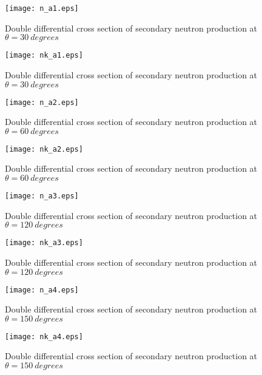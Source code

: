 \documentclass[12pt]{article}
\begin{document}
\begin{figure}[htbp]
\caption{Double differential cross section of secondary neutron production at $\theta = 30~degrees$}
\label{figa1} 
\centerline{\texttt{[image: n\_a1.eps]}}
\end{figure}

\begin{figure}[htbp]
\caption{Double differential cross section of secondary neutron production at $\theta = 30~degrees$}
\label{figa1a} 
\centerline{\texttt{[image: nk\_a1.eps]}}
\end{figure}

\begin{figure}[htbp]
\caption{Double differential cross section of secondary neutron production at $\theta = 60~degrees$}
\label{figa2} 
\centerline{\texttt{[image: n\_a2.eps]}}
\end{figure}

\begin{figure}[htbp]
\caption{Double differential cross section of secondary neutron production at $\theta = 60~degrees$}
\label{figa2a} 
\centerline{\texttt{[image: nk\_a2.eps]}}
\end{figure}

\begin{figure}[htbp]
\caption{Double differential cross section of secondary neutron production at $\theta = 120~degrees$}
\label{figa3} 
\centerline{\texttt{[image: n\_a3.eps]}}
\end{figure}

\begin{figure}[htbp]
\caption{Double differential cross section of secondary neutron production at $\theta = 120~degrees$}
\label{figa3a} 
\centerline{\texttt{[image: nk\_a3.eps]}}
\end{figure}

\begin{figure}[htbp]
\caption{Double differential cross section of secondary neutron production at $\theta = 150~degrees$}
\label{figa4} 
\centerline{\texttt{[image: n\_a4.eps]}}
\end{figure}

\begin{figure}[htbp]
\caption{Double differential cross section of secondary neutron production at $\theta = 150~degrees$}
\label{figa4a} 
\centerline{\texttt{[image: nk\_a4.eps]}}
\end{figure}
\end{document}
